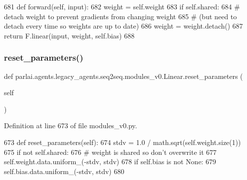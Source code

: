 \begin{DoxyCode}
681     \textcolor{keyword}{def }forward(self, input):
682         weight = self.weight
683         \textcolor{keywordflow}{if} self.shared:
684             \textcolor{comment}{# detach weight to prevent gradients from changing weight}
685             \textcolor{comment}{# (but need to detach every time so weights are up to date)}
686             weight = weight.detach()
687         \textcolor{keywordflow}{return} F.linear(input, weight, self.bias)
688 
\end{DoxyCode}
\mbox{\label{classparlai_1_1agents_1_1legacy__agents_1_1seq2seq_1_1modules__v0_1_1Linear_a1ec65604d05f105801a61de18d16caa1}} 
\subsubsection{\texorpdfstring{reset\+\_\+parameters()}{reset\_parameters()}}
{\footnotesize\ttfamily def parlai.\+agents.\+legacy\+\_\+agents.\+seq2seq.\+modules\+\_\+v0.\+Linear.\+reset\+\_\+parameters (\begin{DoxyParamCaption}\item[{}]{self }\end{DoxyParamCaption})}



Definition at line 673 of file modules\+\_\+v0.\+py.


\begin{DoxyCode}
673     \textcolor{keyword}{def }reset\_parameters(self):
674         stdv = 1.0 / math.sqrt(self.weight.size(1))
675         \textcolor{keywordflow}{if} \textcolor{keywordflow}{not} self.shared:
676             \textcolor{comment}{# weight is shared so don't overwrite it}
677             self.weight.data.uniform\_(-stdv, stdv)
678         \textcolor{keywordflow}{if} self.bias \textcolor{keywordflow}{is} \textcolor{keywordflow}{not} \textcolor{keywordtype}{None}:
679             self.bias.data.uniform\_(-stdv, stdv)
680 
\end{DoxyCode}


